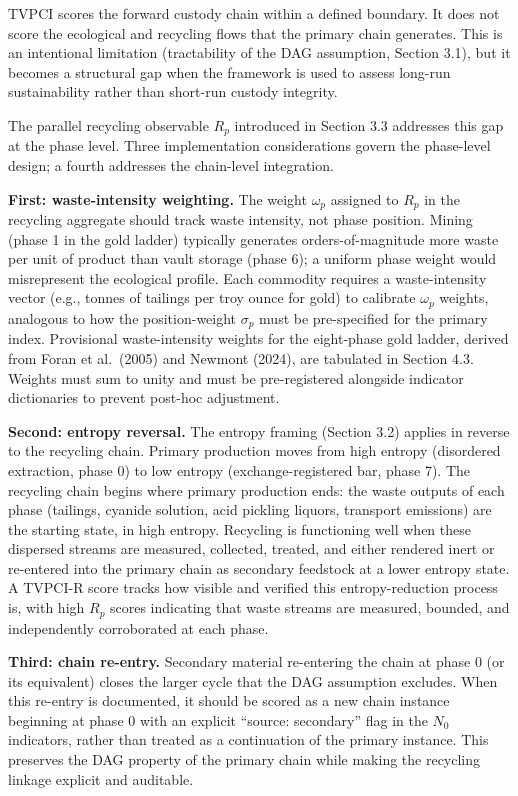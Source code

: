 \documentclass[12pt]{article}
\begin{document}
TVPCI scores the forward custody chain within a defined boundary. It
does not score the ecological and recycling flows that the primary chain
generates. This is an intentional limitation (tractability of the DAG
assumption, Section 3.1), but it becomes a structural gap when the
framework is used to assess long-run sustainability rather than
short-run custody integrity.

The parallel recycling observable \(R_p\) introduced in Section 3.3
addresses this gap at the phase level. Three implementation
considerations govern the phase-level design; a fourth addresses the
chain-level integration.

\textbf{First: waste-intensity weighting.} The weight \(\omega_p\)
assigned to \(R_p\) in the recycling aggregate should track waste
intensity, not phase position. Mining (phase 1 in the gold ladder)
typically generates orders-of-magnitude more waste per unit of product
than vault storage (phase 6); a uniform phase weight would misrepresent
the ecological profile. Each commodity requires a waste-intensity vector
(e.g., tonnes of tailings per troy ounce for gold) to calibrate
\(\omega_p\) weights, analogous to how the position-weight \(\sigma_p\)
must be pre-specified for the primary index. Provisional waste-intensity
weights for the eight-phase gold ladder, derived from Foran et
al.~(2005) and Newmont (2024), are tabulated in Section 4.3. Weights
must sum to unity and must be pre-registered alongside indicator
dictionaries to prevent post-hoc adjustment.

\textbf{Second: entropy reversal.} The entropy framing (Section 3.2)
applies in reverse to the recycling chain. Primary production moves from
high entropy (disordered extraction, phase 0) to low entropy
(exchange-registered bar, phase 7). The recycling chain begins where
primary production ends: the waste outputs of each phase (tailings,
cyanide solution, acid pickling liquors, transport emissions) are the
starting state, in high entropy. Recycling is functioning well when
these dispersed streams are measured, collected, treated, and either
rendered inert or re-entered into the primary chain as secondary
feedstock at a lower entropy state. A TVPCI-R score tracks how visible
and verified this entropy-reduction process is, with high \(R_p\) scores
indicating that waste streams are measured, bounded, and independently
corroborated at each phase.

\textbf{Third: chain re-entry.} Secondary material re-entering the chain
at phase 0 (or its equivalent) closes the larger cycle that the DAG
assumption excludes. When this re-entry is documented, it should be
scored as a new chain instance beginning at phase 0 with an explicit
``source: secondary'' flag in the \(N_0\) indicators, rather than
treated as a continuation of the primary instance. This preserves the
DAG property of the primary chain while making the recycling linkage
explicit and auditable.
\end{document}
